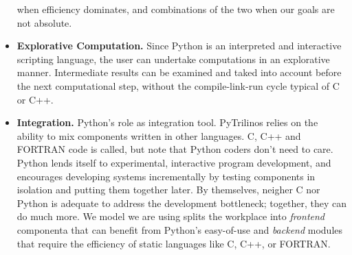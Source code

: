 \documentclass[10pt,relax]{SANDreport}
\begin{document}
\begin{itemize}
when efficiency dominates, and combinations of the two when our goals are
not absolute.
%
\item {\bf Explorative Computation.} Since Python is an interpreted and
interactive scripting language, the user can undertake computations in an
explorative manner. Intermediate results can be examined and taked into
account before the next computational step, without the compile-link-run cycle
typical of C or C++.
%
\item {\bf Integration.} Python's role as integration tool. PyTrilinos relies
on the ability to mix components written in other languages. C, C++ and
FORTRAN code is called, but note that Python coders don't need to care.
  Python lends itself to experimental, interactive program development, and
  encourages developing systems incrementally by testing components in
  isolation and putting them together later.
  By themselves, neigher C nor Python is adequate to address the development
  bottleneck; together, they can do much more. We model we are using splits
  the workplace into {\sl frontend} componenta that can benefit from Python's
  easy-of-use and {\sl backend} modules that require the efficiency of static
  languages like C, C++, or FORTRAN.
%
\end{itemize}

\smallskip
\end{document}
